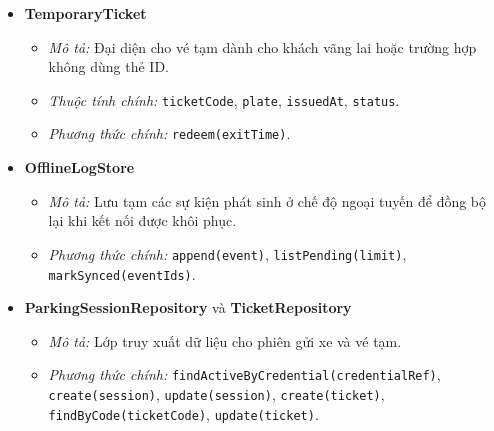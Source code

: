 \begin{itemize}[leftmargin=1.5cm]
    \item \textbf{TemporaryTicket}
    \begin{itemize}
        \item \textit{Mô tả:} Đại diện cho vé tạm dành cho khách vãng lai hoặc trường hợp không dùng thẻ ID.
        \item \textit{Thuộc tính chính:} \texttt{ticketCode}, \texttt{plate}, \texttt{issuedAt}, \texttt{status}.
        \item \textit{Phương thức chính:} \texttt{redeem(exitTime)}.
    \end{itemize}

    \item \textbf{OfflineLogStore}
    \begin{itemize}
        \item \textit{Mô tả:} Lưu tạm các sự kiện phát sinh ở chế độ ngoại tuyến để đồng bộ lại khi kết nối được khôi phục.
        \item \textit{Phương thức chính:} \texttt{append(event)}, \texttt{listPending(limit)}, \texttt{markSynced(eventIds)}.
    \end{itemize}

    \item \textbf{ParkingSessionRepository} và \textbf{TicketRepository}
    \begin{itemize}
        \item \textit{Mô tả:} Lớp truy xuất dữ liệu cho phiên gửi xe và vé tạm.
        \item \textit{Phương thức chính:} \texttt{findActiveByCredential(credentialRef)}, \texttt{create(session)}, \texttt{update(session)}, \texttt{create(ticket)}, \texttt{findByCode(ticketCode)}, \texttt{update(ticket)}.
    \end{itemize}
\end{itemize}

